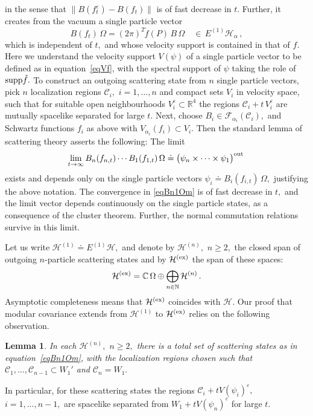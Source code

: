 \documentclass[a4paper,reqno,11pt]{amsart}
\theoremstyle{plain}
\newtheorem{Lem}[Thm]{Lemma}
\theoremstyle{definition}
\numberwithin{equation}{section}
\newcommand{\Bb}{\mathbb{R}}
\newcommand{\Bc}{\mathbb{C}}
\newcommand{\Bn}{\mathbb{N}}
\newcommand{\F}{{\mathcal F}}
\newcommand{\calH}{{\mathcal H}}
\newcommand{\calC}{{\mathcal C}}
\newcommand{\He}{\calH^{(1)}}
\newcommand{\supp}{{\rm supp}}
\newcommand{\eps}{\varepsilon}
\newcommand{\ex}{{\rm ex} }
\renewcommand{\sec}{\alpha}
\newcommand{\Hsec}{\calH_{\sec}}
\newcommand{\Hesec}{\Ee\Hsec} %
\newcommand{\Ee}{E^{(1)}}
\newcommand{\cone}{\calC}   %
\begin{document}
in the sense that  $\|B(f^\eps_t)-B(f_t)\|$ is of fast decrease in $t.$ 
Further, it creates from the vacuum a single particle vector 
\begin{equation*}  
B(f_t) \,\Omega=(2\pi)^2
\tilde{f}(P)\,B\,\Omega\quad\in\,\Hesec\,,
\end{equation*}
which is independent of $t,$ and whose velocity support is contained
in that of $f.$  Here we understand the velocity support $V(\psi)$ of
a single particle vector to be defined as in equation~\eqref{eqVf}, with
the spectral support of $\psi$ taking the role of $\supp \tilde{f}.$ 
To construct an outgoing scattering state from $n$  single
particle vectors, 
pick $n$ localization regions  $\cone_i,$ $i=1,\ldots,n$ 
and compact sets $V_i$ in
velocity space, such that for suitable open neighbourhoods
$V_i^\eps\subset \Bb^4$ the regions 
$\cone_i+t\,V_i^\eps$ are mutually spacelike separated for large $t.$ 
Next, choose $B_i\in\F_{\sec_i}(\cone_i),$ and Schwartz functions $f_i$ as
above with $V_{\sec_i}(f_i)\subset V_i.$ Then the standard lemma of
scattering theory asserts the following: The limit 
\begin{equation}  \label{eqBn1Om}
\lim_{t\rightarrow\infty} B_n(f_{n,t})\cdots B_1(f_{1,t})\,\Omega \doteq
\big(\psi_n\times\cdots\times\psi_1\big)^{{\rm out}}\, 
\end{equation}
exists and depends  only on the single particle vectors 
$\psi_i\doteq B_i(f_{i,t})\,\Omega,$ justifying the above notation. 
The convergence  in \eqref{eqBn1Om} is of fast decrease in $t,$ and
the limit vector depends continuously on the single particle
states, as a consequence of the cluster theorem.  
Further, the normal commutation relations survive in this limit. 

Let us write $\He\doteq\Ee\calH,$ and denote by $\calH^{(n)},$
$n\geq2,$ the closed span of outgoing $n$-particle scattering states 
and by $\calH^{(\ex)}$ the  span of these spaces: 
\begin{equation} \label{eqHex}
\calH^{(\ex)}=\Bc\,\Omega\oplus\bigoplus_{n\in\Bn} \calH^{(n)}\,.
\end{equation}
Asymptotic completeness means that $\calH^{(\ex)}$ coincides 
with $\calH.$ 
Our proof that modular co\-va\-riance extends from $\He$ to
$\calH^{(\ex)}$ relies on the following observation. 
\begin{Lem} \label{Velo}
In each $\calH^{(n)},$ $n\geq 2,$ there is a total set of scattering states as 
in equation~\eqref{eqBn1Om}, with the localization regions chosen such
that $\cone_1,\dots,\cone_{n-1}\subset W_1'$ and $\cone_n= W_1.$  
\end{Lem}
In particular, for these scattering states the regions
$\cone_i+tV(\psi_i)^\eps,$ $i=1,\ldots,n-1,$ are spacelike 
separated from  $W_1+tV(\psi_n)^\eps$ for large $t.$ 
\end{document}

